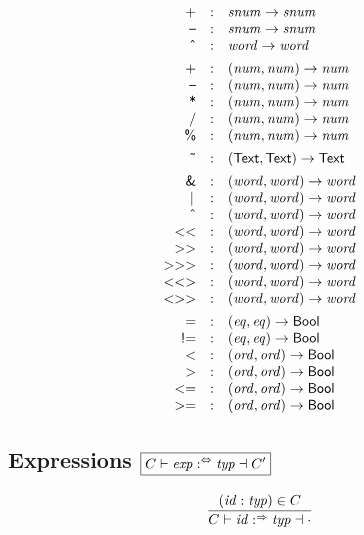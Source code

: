 $$
\begin{array}{@{}rcl@{}}
\K{+} &:& \x{snum} \Kto \x{snum} \\
\K\textendash &:& \x{snum} \Kto \x{snum} \\
\K{\^{}} &:& \x{word} \Kto \x{word} \\
[1ex]
\K{+} &:& (\x{num}, \x{num}) \Kto \x{num} \\
\K\textendash &:& (\x{num}, \x{num}) \Kto \x{num} \\
\K* &:& (\x{num}, \x{num}) \Kto \x{num} \\
\K/ &:& (\x{num}, \x{num}) \Kto \x{num} \\
\K\% &:& (\x{num}, \x{num}) \Kto \x{num} \\
[1ex]
\K{\~{}} &:& (\K{Text}, \K{Text}) \Kto \K{Text} \\
[1ex]
\K{\&} &:& (\x{word}, \x{word}) \Kto \x{word} \\
\K{\textbar}\, &:& (\x{word}, \x{word}) \Kto \x{word} \\
\K{\^{}} &:& (\x{word}, \x{word}) \Kto \x{word} \\
\Klt\Klt &:& (\x{word}, \x{word}) \Kto \x{word} \\
\Kgt\Kgt &:& (\x{word}, \x{word}) \Kto \x{word} \\
\Kgt\Kgt\Kgt &:& (\x{word}, \x{word}) \Kto \x{word} \\
\Klt\Klt\Kgt &:& (\x{word}, \x{word}) \Kto \x{word} \\
\Klt\Kgt\Kgt &:& (\x{word}, \x{word}) \Kto \x{word} \\
[1ex]
\K{=} &:& (\x{eq}, \x{eq}) \Kto \K{Bool} \\
\K{!=} &:& (\x{eq}, \x{eq}) \Kto \K{Bool} \\
\Klt &:& (\x{ord}, \x{ord}) \Kto \K{Bool} \\
\Kgt &:& (\x{ord}, \x{ord}) \Kto \K{Bool} \\
{\Klt}{\K=} &:& (\x{ord}, \x{ord}) \Kto \K{Bool} \\
{\Kgt}{\K=} &:& (\x{ord}, \x{ord}) \Kto \K{Bool} \\
\end{array}
$$


\subsection*{Expressions \hfill $\boxed{C \vdash \operatorname{\mathit{exp}} :^\Leftrightarrow \operatorname{\mathit{typ}} \dashv C'}$}

$$
\frac{
  (\operatorname{\mathit{id}} : \operatorname{\mathit{typ}}) \in C
}{
  C \vdash \operatorname{\mathit{id}} :^\Rightarrow \operatorname{\mathit{typ}} \dashv \cdot
}
$$

